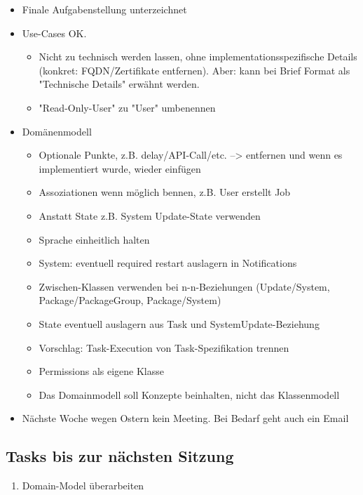 \documentclass[class=scrbook,crop=false]{standalone}
\begin{document}
	\begin{itemize}
        \item Finale Aufgabenstellung unterzeichnet
        \item Use-Cases OK.
        \begin{itemize}
            \item Nicht zu technisch werden lassen, ohne implementationsspezifische Details (konkret: FQDN/Zertifikate entfernen). Aber: kann bei Brief Format als "Technische Details" erwähnt werden.
            \item "Read-Only-User" zu "User" umbenennen
        \end{itemize}
        \item Domänenmodell
        \begin{itemize}
            \item Optionale Punkte, z.B. delay/API-Call/etc. --> entfernen und wenn es implementiert wurde, wieder einfügen
            \item Assoziationen wenn möglich bennen, z.B. User erstellt Job
            \item Anstatt State z.B. System Update-State verwenden
            \item Sprache einheitlich halten
            \item System: eventuell required restart auslagern in Notifications
            \item Zwischen-Klassen verwenden bei n-n-Beziehungen (Update/System, Package/PackageGroup, Package/System)
            \item State eventuell auslagern aus Task und SystemUpdate-Beziehung
            \item Vorschlag: Task-Execution von Task-Spezifikation trennen
            \item Permissions als eigene Klasse
            \item Das Domainmodell soll Konzepte beinhalten, nicht das Klassenmodell
        \end{itemize}
        \item Nächste Woche wegen Ostern kein Meeting. Bei Bedarf geht auch ein Email
    \end{itemize}
	
    \subsection*{Tasks bis zur nächsten Sitzung}
    
    \begin{enumerate}
        \item Domain-Model überarbeiten
    \end{enumerate}
\end{document}
